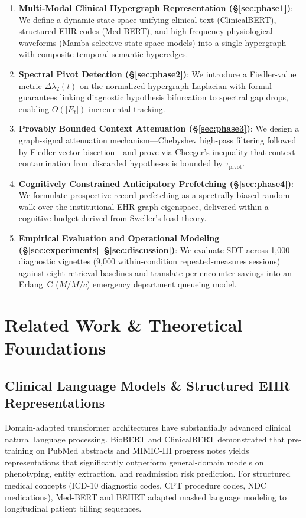 \documentclass[10pt, onecolumn]{article}
\begin{document}
\begin{enumerate}
  \item \textbf{Multi-Modal Clinical Hypergraph Representation (\S\ref{sec:phase1})}: We define a dynamic state space unifying clinical text (ClinicalBERT), structured EHR codes (Med-BERT), and high-frequency physiological waveforms (Mamba selective state-space models) into a single hypergraph with composite temporal-semantic hyperedges.
  \item \textbf{Spectral Pivot Detection (\S\ref{sec:phase2})}: We introduce a Fiedler-value metric $\Delta \lambda_2(t)$ on the normalized hypergraph Laplacian with formal guarantees linking diagnostic hypothesis bifurcation to spectral gap drops, enabling $O(|E_t|)$ incremental tracking.
  \item \textbf{Provably Bounded Context Attenuation (\S\ref{sec:phase3})}: We design a graph-signal attenuation mechanism---Chebyshev high-pass filtering followed by Fiedler vector bisection---and prove via Cheeger's inequality that context contamination from discarded hypotheses is bounded by $\tau_{\text{pivot}}$.
  \item \textbf{Cognitively Constrained Anticipatory Prefetching (\S\ref{sec:phase4})}: We formulate prospective record prefetching as a spectrally-biased random walk over the institutional EHR graph eigenspace, delivered within a cognitive budget derived from Sweller's load theory.
  \item \textbf{Empirical Evaluation and Operational Modeling (\S\ref{sec:experiments}--\S\ref{sec:discussion})}: We evaluate SDT across 1{,}000 diagnostic vignettes (9{,}000 within-condition repeated-measures sessions) against eight retrieval baselines and translate per-encounter savings into an Erlang~C ($M/M/c$) emergency department queueing model.
\end{enumerate}

\section{Related Work \& Theoretical Foundations}
\label{sec:related}

\subsection{Clinical Language Models \& Structured EHR Representations}

Domain-adapted transformer architectures have substantially advanced clinical natural language processing. BioBERT \cite{lee2020biobert} and ClinicalBERT \cite{huang2019clinicalbert,alsentzer2019publicly} demonstrated that pre-training on PubMed abstracts and MIMIC-III progress notes yields representations that significantly outperform general-domain models \cite{devlin2019bert} on phenotyping, entity extraction, and readmission risk prediction. For structured medical concepts (ICD-10 diagnostic codes, CPT procedure codes, NDC medications), Med-BERT \cite{rasmy2021medbert} and BEHRT \cite{li2020behrt} adapted masked language modeling to longitudinal patient billing sequences.
\end{document}
